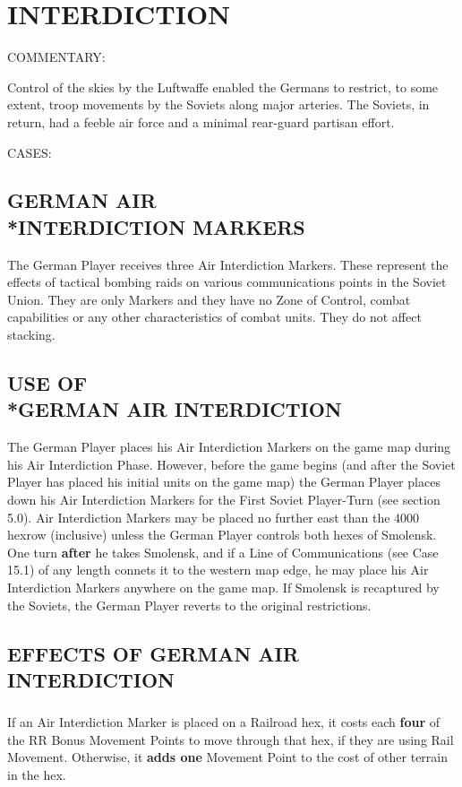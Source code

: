 \section{INTERDICTION}

COMMENTARY:

Control of the skies by the Luftwaffe enabled the Germans to restrict, to some extent, troop movements by the Soviets along major arteries. The Soviets, in return, had a feeble air force and a minimal rear-guard partisan effort.

CASES:

\subsection{GERMAN AIR\\*INTERDICTION MARKERS}

The German Player receives three Air Interdiction Markers. These represent the effects of tactical bombing raids on various communications points in the Soviet Union. They are only Markers and they have no Zone of Control, combat capabilities or any other characteristics of combat units. They do not affect stacking.

\subsection{USE OF\\*GERMAN AIR INTERDICTION}

The German Player places his Air Interdiction Markers on the game map during his Air Interdiction Phase. However, before the game begins (and after the Soviet Player has placed his initial units on the game map) the German Player places down his Air Interdiction Markers for the First Soviet Player-Turn (see section 5.0). Air Interdiction Markers may be placed no further east than the 4000 hexrow (inclusive) unless the German Player controls both hexes of Smolensk. One turn \textbf{after} he takes Smolensk, and if a Line of Communications (see Case 15.1) of any length connets it to the western map edge, he may place his Air Interdiction Markers anywhere on the game map. If Smolensk is recaptured by the Soviets, the German Player reverts to the original restrictions.

\subsection{EFFECTS OF GERMAN AIR INTERDICTION}

\subsubsection{} If an Air Interdiction Marker is placed on a Railroad hex, it costs each \textbf{four} of the RR Bonus Movement Points to move through that hex, if they are using Rail Movement. Otherwise, it \textbf{adds one} Movement Point to the cost of other terrain in the hex.

